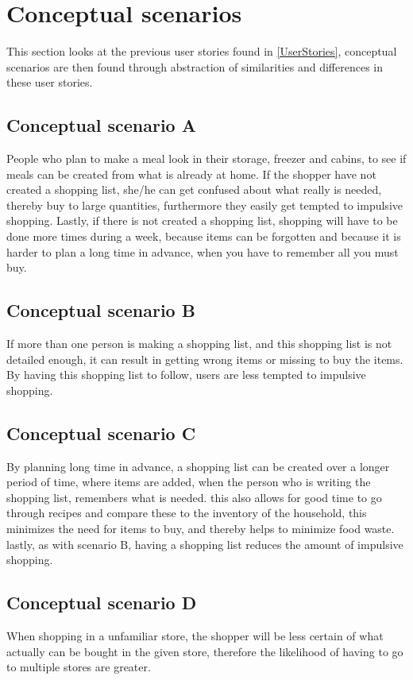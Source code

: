 \section{Conceptual scenarios} \label{conceptualScenarios}
This section looks at the previous user stories found in \cref{UserStories}, conceptual scenarios are then found through abstraction of similarities and differences in these user stories.

\subsection{Conceptual scenario A}
People who plan to make a meal look in their storage, freezer and cabins, to see if meals can be created from what is already at home. If the shopper have not created a shopping list, she/he can get confused about what really is needed, thereby buy to large quantities, furthermore they easily get tempted to impulsive shopping. Lastly, if there is not created a shopping list, shopping will have to be done more times during a week, because items can be forgotten and because it is harder to plan a long time in advance, when you have to remember all you must buy.

\subsection{Conceptual scenario B}
If more than one person is making a shopping list, and this shopping list is not detailed enough, it can result in getting wrong items or missing to buy the items. By having this shopping list to follow, users are less tempted to impulsive shopping.

\subsection{Conceptual scenario C}
By planning long time in advance, a shopping list can be created over a longer period of time, where items are added, when the person who is writing the shopping list, remembers what is needed. this also allows for good time to go through recipes and compare these to the inventory of the household, this minimizes the need for items to buy, and thereby helps to minimize food waste. lastly, as with scenario B, having a shopping list reduces the amount of impulsive shopping.

\subsection{Conceptual scenario D}
When shopping in a unfamiliar store, the shopper will be less certain of what actually can be bought in the given store, therefore the likelihood of having to go to multiple stores are greater.